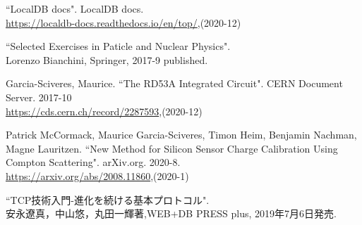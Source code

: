 \begin{thebibliography}{9}
``LocalDB docs". LocalDB docs. \\
\url{https://localdb-docs.readthedocs.io/en/top/},(2020-12)

``Selected Exercises in Paticle and Nuclear Physics".\\
Lorenzo Bianchini, Springer, 2017-9 published.

Garcia-Sciveres, Maurice. ``The RD53A Integrated Circuit". CERN Document Server. 2017-10\\
\url{https://cds.cern.ch/record/2287593},(2020-12)

Patrick McCormack, Maurice Garcia-Sciveres, Timon Heim, Benjamin Nachman, Magne Lauritzen. ``New Method for Silicon Sensor Charge Calibration Using Compton Scattering". arXiv.org. 2020-8.\\
\url{https://arxiv.org/abs/2008.11860},(2020-1)

``TCP技術入門-進化を続ける基本プロトコル".\\
安永遼真，中山悠，丸田一輝著,WEB+DB PRESS plus, 2019年7月6日発売.

\end{thebibliography}
